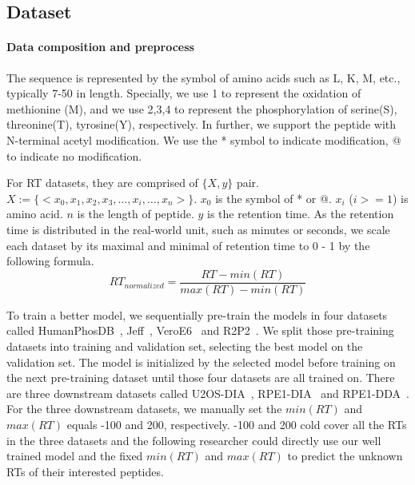 
\subsection{Dataset}
\paragraph*{Data composition and preprocess}
The sequence is represented by the symbol of amino acids such as L, K, M, etc., typically 7-50 in length. Specially, we use 1 to represent the oxidation of methionine (M), and we use 2,3,4 to represent the phosphorylation of serine(S), threonine(T), tyrosine(Y), respectively. In further, we support the peptide with N-terminal acetyl modification. We use the * symbol to indicate modification, @ to indicate no modification. 

For RT datasets, they are comprised of \( \{X, y\} \) pair. 
$X:= \{ <x_0, x_1, x_2, x_3,\dots, x_i, \dots, x_n>\}$. $x_0$ is the symbol of * or @. 
$x_i$ ($i>= 1$) is amino acid. $n$ is the length of peptide. \( y \) is the retention time. 
As the retention time is distributed in the real-world unit, such as minutes or seconds, we scale each dataset by its maximal and minimal of retention time to 0 - 1 by the following formula. 
\[RT_{normalized} =  \frac{RT-min(RT)}{max(RT)-min(RT)}\]

To train a better model, we sequentially pre-train the models in four datasets called 
HumanPhosDB~\cite{lawrence2016plug}, Jeff~\cite{liu2018vivo}, VeroE6~\cite{bouhaddou2020global}
and R2P2~\cite{leutert2019r2}. We split those pre-training datasets into training and validation set, selecting the best model on the validation set. The model is initialized by the selected model before training on the next pre-training dataset until those four datasets are all trained on. There are three downstream datasets called U2OS-DIA~\cite{wang2020naguider},
RPE1-DIA~\cite{bekker2020rapid} and RPE1-DDA~\cite{bekker2020rapid}. For the three downstream datasets, we manually set the $min(RT)$ and $max(RT)$ equals -100 and 200, respectively. -100 and 200 cold cover all the RTs in the three datasets and the following researcher could directly use our well trained model and the fixed $min(RT)$ and $max(RT)$ to predict the unknown RTs of their interested peptides.

